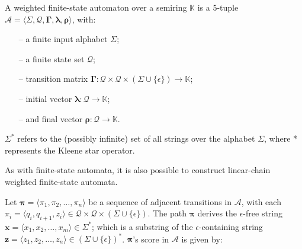 \begin{definition}
  \label{def:wfa}
  A weighted finite-state automaton over a semiring $\mathbb{K}$ is a 5-tuple
  $\mathcal{A} = \langle \Sigma, \mathcal{Q}, \bm{\Gamma}, \bm{\lambda}, \bm{\rho} \rangle$,
  with:

  \begin{itemize}
    \itemsep0em
    \item[--] a finite input alphabet $\Sigma$;
    \item[--] a finite state set $\mathcal{Q}$;
    \item[--] transition matrix $\bm{\Gamma}: \mathcal{Q} \times \mathcal{Q} \times
    (\Sigma \cup \{\epsilon\}) \rightarrow \mathbb{K}$;
    \item[--] initial vector $\bm{\lambda}: \mathcal{Q} \rightarrow \mathbb{K}$;
    \item[--] and final vector $\bm{\rho}: \mathcal{Q} \rightarrow \mathbb{K}$.
  \end{itemize}

  \begin{remark}
    $\Sigma^{*}$ refers to the (possibly infinite) set of all strings over the
    alphabet $\Sigma$, where * represents the Kleene star operator.
  \end{remark}

  \begin{remark}
    As with finite-state automata, it is also possible to construct linear-chain
    weighted finite-state automata.
  \end{remark}
  
\end{definition}

\begin{definition}

  Let $\bm{\pi} = \langle \pi_1, \pi_2, \dots, \pi_n \rangle$ be a sequence of
  adjacent transitions in $\mathcal{A}$, with each $\pi_i = \langle q_i,
  q_{i+1}, z_i \rangle \in \mathcal{Q} \times \mathcal{Q} \times (\Sigma \cup
  \{\epsilon\})$. The path $\bm{\pi}$ derives the $\epsilon$-free string
  $\bm{x} = \langle x_1, x_2, \dots, x_m \rangle \in \Sigma^{*}$; which is a
  substring of the $\epsilon$-containing string $\bm{z} = \langle z_1, z_2,
  \dots, z_n \rangle \in (\Sigma \cup \{\epsilon\})^{*}$. $\bm{\pi}$'s score in
  $\mathcal{A}$ is given by:
  
\end{definition}

